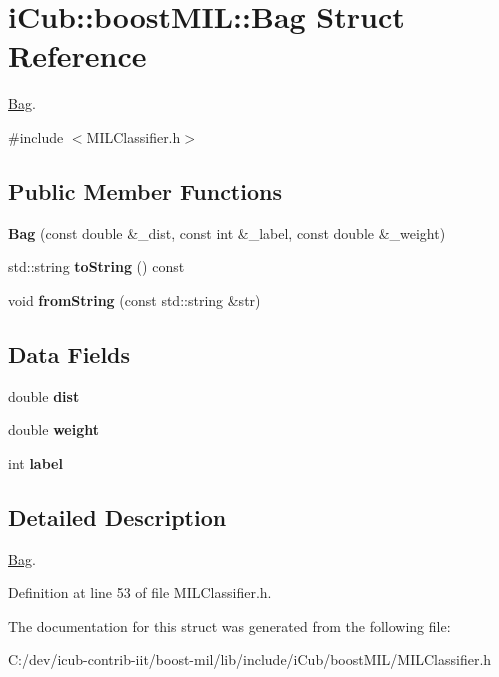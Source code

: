 \section{i\+Cub\+:\+:boost\+M\+I\+L\+:\+:Bag Struct Reference}
\label{structiCub_1_1boostMIL_1_1Bag}


\hyperlink{structiCub_1_1boostMIL_1_1Bag}{Bag}.  




{\ttfamily \#include $<$M\+I\+L\+Classifier.\+h$>$}

\subsection*{Public Member Functions}
\begin{DoxyCompactItemize}
\item 
{\bfseries Bag} (const double \&\+\_\+dist, const int \&\+\_\+label, const double \&\+\_\+weight)\label{structiCub_1_1boostMIL_1_1Bag_a65d0998519f5b7c59a0291df872f2fbc}

\item 
std\+::string {\bfseries to\+String} () const \label{structiCub_1_1boostMIL_1_1Bag_a4022ab94ba11902d9216e11783164fcb}

\item 
void {\bfseries from\+String} (const std\+::string \&str)\label{structiCub_1_1boostMIL_1_1Bag_a7e0950894fd4cb501b7d243ff8ac7b00}

\end{DoxyCompactItemize}
\subsection*{Data Fields}
\begin{DoxyCompactItemize}
\item 
double {\bfseries dist}\label{structiCub_1_1boostMIL_1_1Bag_a0117789b1d8a2dff784e5d1a7200734d}

\item 
double {\bfseries weight}\label{structiCub_1_1boostMIL_1_1Bag_aa60d059cb938c95249cc3fae5dc42486}

\item 
int {\bfseries label}\label{structiCub_1_1boostMIL_1_1Bag_a97a654e0809e27dbc0e1d9a42721bf76}

\end{DoxyCompactItemize}


\subsection{Detailed Description}
\hyperlink{structiCub_1_1boostMIL_1_1Bag}{Bag}. 

Definition at line 53 of file M\+I\+L\+Classifier.\+h.



The documentation for this struct was generated from the following file\+:\begin{DoxyCompactItemize}
\item 
C\+:/dev/icub-\/contrib-\/iit/boost-\/mil/lib/include/i\+Cub/boost\+M\+I\+L/M\+I\+L\+Classifier.\+h\end{DoxyCompactItemize}
